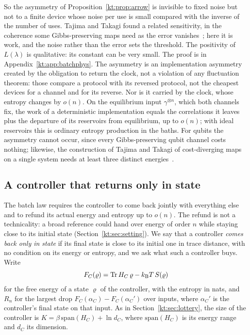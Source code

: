 So the asymmetry of Proposition~\ref{kt:prop:arrow} is invisible to fixed noise but not to a finite device whose noise per use is small compared with the inverse of the number of uses. Tajima and Takagi found a related sensitivity, in the coherence some Gibbs-preserving maps need as the error vanishes~\cite{TajimaTakagi25}; here it is work, and the noise rather than the error sets the threshold. The positivity of $L(\lambda)$ is qualitative: its constant can be very small. The proof is in Appendix~\ref{kt:app:batchphys}. The asymmetry is an implementation asymmetry created by the obligation to return the clock, not a violation of any fluctuation theorem: those compare a protocol with its reversed protocol, not the cheapest devices for a channel and for its reverse. Nor is it carried by the clock, whose entropy changes by $o(n)$. On the equilibrium input $\gamma^{\otimes n}$, which both channels fix, the work of a deterministic implementation equals the correlations it leaves plus the departure of its reservoirs from equilibrium, up to $o(n)$; with ideal reservoirs this is ordinary entropy production in the baths. For qubits the asymmetry cannot occur, since every Gibbs-preserving qubit channel costs nothing; likewise, the construction of Tajima and Takagi of cost-diverging maps on a single system needs at least three distinct energies~\cite{TajimaTakagi25}.

\subsection{A controller that returns only in state}\label{kt:sec:embezzle}

The batch law requires the controller to come back jointly with everything else and to refund its actual energy and entropy up to $o(n)$. The refund is not a technicality: a broad reference could hand over energy of order $n$ while staying close to its initial state (Section~\ref{kt:sec:setting}). We say that a controller \emph{comes back only in state} if its final state is close to its initial one in trace distance, with no condition on its energy or entropy, and we ask what such a controller buys. Write
\[
F_C(\varrho)=\operatorname{Tr} H_C\,\varrho-k_{\mathrm B} T\,S(\varrho)
\]
for the free energy of a state $\varrho$ of the controller, with the entropy in nats, and $R_n$ for the largest drop $F_C(\alpha_C)-F_C(\alpha_C')$ over inputs, where $\alpha_C'$ is the controller's final state on that input. As in Section~\ref{kt:sec:lottery}, the size of the controller is $K=\beta\,\mathrm{span}(H_C)+\ln d_C$, where $\mathrm{span}(H_C)$ is its energy range and $d_C$ its dimension.

